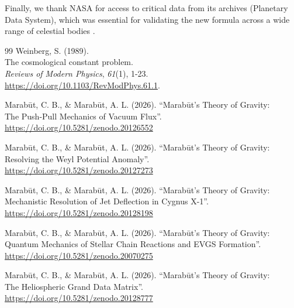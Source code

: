 \documentclass[11pt, a4paper, table]{article}
\begin{document}
Finally, we thank NASA for access to critical data from its archives (Planetary Data System), which was essential for validating the new formula across a wide range of celestial bodies \cite{nasa2024}.

\clearpage
\begin{thebibliography}{99}
   Weinberg, S. (1989). \\
  The cosmological constant problem. \\
  \textit{Reviews of Modern Physics}, \textit{61}(1), 1-23. \\
  \url{https://doi.org/10.1103/RevModPhys.61.1}.

  Marab\={u}t, C. B., \& Marab\={u}t, A. L. (2026). ``Marab\={u}t's Theory of Gravity: \\
  The Push-Pull Mechanics of Vacuum Flux''. \\
  \url{https://doi.org/10.5281/zenodo.20126552}

  Marab\={u}t, C. B., \& Marab\={u}t, A. L. (2026). ``Marab\={u}t's Theory of Gravity: \\
  Resolving the Weyl Potential Anomaly''. \\
  \url{https://doi.org/10.5281/zenodo.20127273}

  Marab\={u}t, C. B., \& Marab\={u}t, A. L. (2026). ``Marab\={u}t's Theory of Gravity: \\
  Mechanistic Resolution of Jet Deflection in Cygnus X-1''. \\
  \url{https://doi.org/10.5281/zenodo.20128198}

  Marab\={u}t, C. B., \& Marab\={u}t, A. L. (2026). ``Marab\={u}t's Theory of Gravity: \\
  Quantum Mechanics of Stellar Chain Reactions and EVGS Formation''. \\
  \url{https://doi.org/10.5281/zenodo.20070275}

  Marab\={u}t, C. B., \& Marab\={u}t, A. L. (2026). ``Marab\={u}t's Theory of Gravity: \\
  The Heliospheric Grand Data Matrix''. \\
  \url{https://doi.org/10.5281/zenodo.20128777}


\end{thebibliography}
\end{document}
